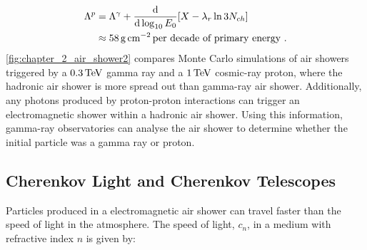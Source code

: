 \begin{equation}
    \begin{aligned}
    \Lambda^p &= \Lambda^\gamma + \dv{ }{\log_{10}E_0}\qty[X-\lambda_r\ln 3N_{ch}] \\
    &\approx 58\,\si{\gram\per\centi\meter\squared}\,\text{per decade of primary energy}\text{ .}
    \end{aligned}
\end{equation}
\noindent \autoref{fig:chapter_2_air_shower2} compares Monte Carlo simulations of air showers triggered by a $0.3\,\TeV$ gamma ray and a $1\,\TeV$ cosmic-ray proton, where the hadronic air shower is more spread out than gamma-ray air shower. Additionally, any photons produced by proton-proton interactions can trigger an electromagnetic shower within a hadronic air shower. Using this information, gamma-ray observatories can analyse the air shower to determine whether the initial particle was a gamma ray or proton.

\subsection{Cherenkov Light and Cherenkov Telescopes}

Particles produced in a electromagnetic air shower can travel faster than the speed of light in the atmosphere. The speed of light, $c_n$, in a medium with refractive index $n$ is given by:

